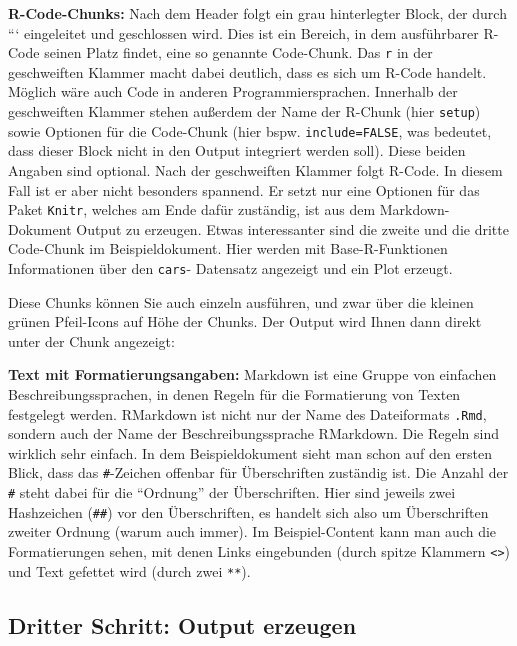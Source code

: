 \documentclass[
]{book}
\begin{document}
\textbf{R-Code-Chunks: } Nach dem Header folgt ein grau hinterlegter Block, der durch ``` eingeleitet und geschlossen wird. Dies ist ein Bereich, in dem ausführbarer R-Code seinen Platz findet, eine so genannte Code-Chunk. Das \texttt{r} in der geschweiften Klammer macht dabei deutlich, dass es sich um R-Code handelt. Möglich wäre auch Code in anderen Programmiersprachen. Innerhalb der geschweiften Klammer stehen außerdem der Name der R-Chunk (hier \texttt{setup}) sowie Optionen für die Code-Chunk (hier bspw. \texttt{include=FALSE}, was bedeutet, dass dieser Block nicht in den Output integriert werden soll). Diese beiden Angaben sind optional. Nach der geschweiften Klammer folgt R-Code. In diesem Fall ist er aber nicht besonders spannend. Er setzt nur eine Optionen für das Paket \texttt{Knitr}, welches am Ende dafür zuständig, ist aus dem Markdown-Dokument Output zu erzeugen. Etwas interessanter sind die zweite und die dritte Code-Chunk im Beispieldokument. Hier werden mit Base-R-Funktionen Informationen über den \texttt{cars}- Datensatz angezeigt und ein Plot erzeugt.

Diese Chunks können Sie auch einzeln ausführen, und zwar über die kleinen grünen Pfeil-Icons auf Höhe der Chunks. Der Output wird Ihnen dann direkt unter der Chunk angezeigt:

\textbf{Text mit Formatierungsangaben:} Markdown ist eine Gruppe von einfachen Beschreibungssprachen, in denen Regeln für die Formatierung von Texten festgelegt werden. RMarkdown ist nicht nur der Name des Dateiformats \texttt{.Rmd}, sondern auch der Name der Beschreibungssprache RMarkdown. Die Regeln sind wirklich sehr einfach. In dem Beispieldokument sieht man schon auf den ersten Blick, dass das \texttt{\#}-Zeichen offenbar für Überschriften zuständig ist. Die Anzahl der \texttt{\#} steht dabei für die ``Ordnung'' der Überschriften. Hier sind jeweils zwei Hashzeichen (\texttt{\#\#}) vor den Überschriften, es handelt sich also um Überschriften zweiter Ordnung (warum auch immer). Im Beispiel-Content kann man auch die Formatierungen sehen, mit denen Links eingebunden (durch spitze Klammern \texttt{\textless{}\textgreater{}}) und Text gefettet wird (durch zwei \texttt{**}).

\hypertarget{dritter-schritt-output-erzeugen}{%
\subsection{Dritter Schritt: Output erzeugen}\label{dritter-schritt-output-erzeugen}}
\end{document}
